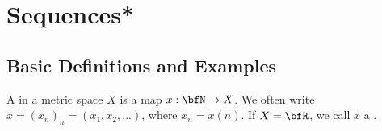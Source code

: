 \chapter{Sequences*}\label{chapter:sequences}
\vspace{12pt}

\section{Basic Definitions and Examples}
    \begin{definition}
        A  in a metric space $X$ is a map $x:\bfN \rightarrow X$. We often write $x = (x_n)_n = (x_1,x_2,...)$, where $x_n = x(n)$. If $X = \bfR$, we call $x$ a .
    \end{definition}

